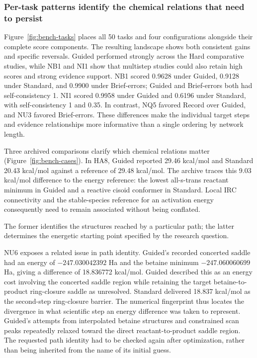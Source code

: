 \subsubsection{Per-task patterns identify the chemical relations that need to persist}

Figure~\ref{fig:bench-tasks} places all 50 tasks and four configurations alongside their complete score components. The resulting landscape shows both consistent gains and specific reversals. Guided performed strongly across the Hard comparative studies, while NB1 and NI1 show that multistep studies could also retain high scores and strong evidence support. NB1 scored 0.9628 under Guided, 0.9128 under Standard, and 0.9900 under Brief-errors; Guided and Brief-errors both had self-consistency 1. NI1 scored 0.9958 under Guided and 0.6196 under Standard, with self-consistency 1 and 0.35. In contrast, NQ5 favored Record over Guided, and NU3 favored Brief-errors. These differences make the individual target steps and evidence relationships more informative than a single ordering by network length.

Three archived comparisons clarify which chemical relations matter (Figure~\ref{fig:bench-cases}). In HA8, Guided reported 29.46 kcal/mol and Standard 20.43 kcal/mol against a reference of 29.48 kcal/mol. The archive traces this 9.03 kcal/mol difference to the energy reference: the lowest all-s-trans reactant minimum in Guided and a reactive cisoid conformer in Standard. Local IRC connectivity and the stable-species reference for an activation energy consequently need to remain associated without being conflated.

\newpage

The former identifies the structures reached by a particular path; the latter determines the energetic starting point specified by the research question.



NU6 exposes a related issue in path identity. Guided's recorded concerted saddle had an energy of $-247.030042392$ Ha and the betaine minimum $-247.060060699$ Ha, giving a difference of 18.836772 kcal/mol. Guided described this as an energy cost involving the concerted saddle region while retaining the target betaine-to-product ring-closure saddle as unresolved. Standard delivered 18.837 kcal/mol as the second-step ring-closure barrier. The numerical fingerprint thus locates the divergence in what scientific step an energy difference was taken to represent. Guided's attempts from interpolated betaine structures and constrained scan peaks repeatedly relaxed toward the direct reactant-to-product saddle region. The requested path identity had to be checked again after optimization, rather than being inherited from the name of its initial guess.

